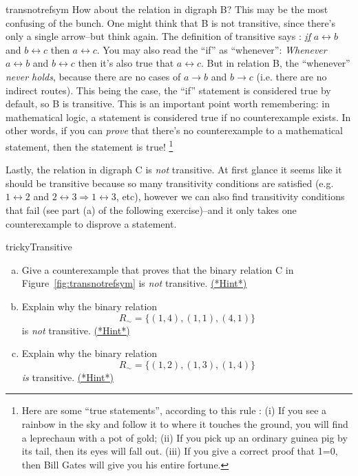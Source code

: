 \begin{example}{transnotrefsym}
How about the relation in digraph B?  This may be the most confusing of the bunch. One might think that B is not transitive, since there's only a single arrow--but think again. The definition of transitive says : \underline{\emph{ if}}  $a \rel b$ and $b \rel c$ then  $a \rel c$.  You may also read the ``if'' as ``whenever'':  \emph{Whenever}  $a \rel b$ and $b \rel c$ then it's also true that $a \rel c$.  But in relation B, the ``whenever'' \emph{never holds}, because there are no cases of $a \rightarrow b$ and $b\rightarrow c$  (i.e. there are no indirect routes).    This being the case, the ``if'' statement is considered true by default, so B is transitive.  This is an important point worth remembering: in mathematical logic, a statement is considered true if no counterexample exists. In other words, if you can \emph{prove} that there's no counterexample to a mathematical statement, then the statement is true! \footnote{Here are some ``true statements'', according to this rule :  (i) If you see a rainbow in the sky and follow it to where it touches the ground, you will find a leprechaun with a pot of gold; (ii) If you pick up an ordinary guinea pig by its tail, then its eyes will fall out. (iii) If you give a correct proof that 1=0, then Bill Gates will give you his entire fortune. }    
 

Lastly, the relation in digraph C is \emph{not} transitive. At first glance it seems like it should be transitive because so many transitivity conditions are satisfied (e.g. $1 \rel 2$ and $2 \rel 3 \Rightarrow 1 \rel 3$, etc), however we can also find transitivity conditions that fail (see part (a) of the following exercise)--and it only takes one counterexample to disprove a statement. 
\end{example}

\begin{exercise}{trickyTransitive}
\begin{enumerate}[(a)]
\item Give a counterexample that proves that the binary relation C in Figure~\ref{fig:transnotrefsym} is \emph{not} transitive. \hyperref[secEqRelChapHints]{(*Hint*)}
\item
Explain why the binary relation 
\[ R_{\sim} = \{(1,4), (1,1),(4,1) \} \]
is \emph{not} transitive.
\hyperref[secEqRelChapHints]{(*Hint*)} 
\item
Explain why the binary relation 
\[ R_{\sim} = \{(1,2), (1,3),(1,4) \} \]
\emph{is} transitive.
\hyperref[secEqRelChapHints]{(*Hint*)}
\end{enumerate}
\end{exercise}

